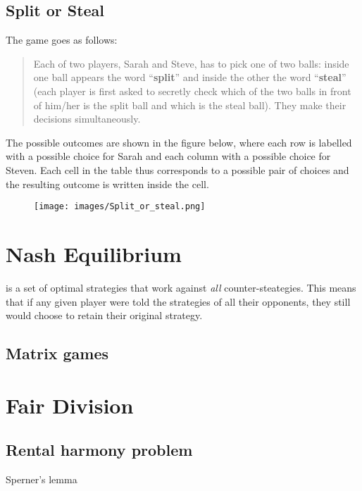 \subsection{Split or Steal}
The game goes as follows:
\begin{quote}
Each of two players, Sarah and Steve, has to pick one of two balls: inside one ball appears the word ``\textbf{split}'' and inside the other the word ``\textbf{steal}'' (each player is first asked to secretly check which of the two balls in front of him/her is the split ball and which is the steal ball). They make their decisions simultaneously. 
\end{quote}

The possible outcomes are shown in the figure below, where each row is labelled with a possible choice for Sarah and each column with a possible choice for Steven. Each cell in the table thus corresponds to a possible pair of choices and the resulting outcome is written inside the cell.

\begin{figure}[H]
    \centering
    \texttt{[image: images/Split\_or\_steal.png]}
\end{figure}

\section{Nash Equilibrium}
 is a set of optimal strategies that work against \textit{all} counter-steategies. This means that if any given player were told the strategies of all their opponents, they still would choose to retain their original strategy. 

\subsection{Matrix games}

\section{Fair Division}
\subsection{Rental harmony problem}
Sperner's lemma

